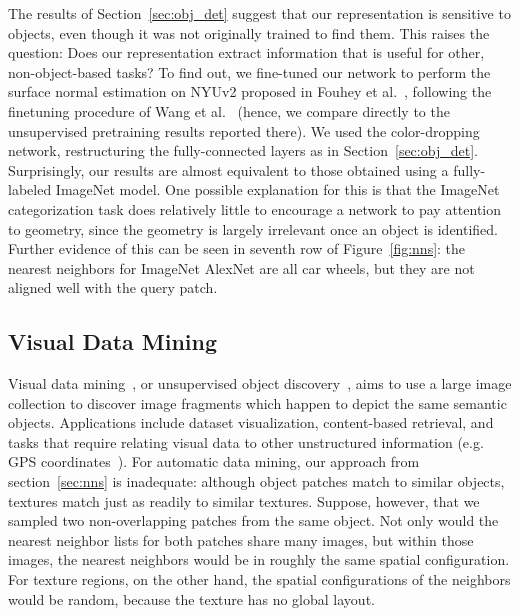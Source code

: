 \documentclass[10pt,twocolumn,letterpaper]{article}
\begin{document}
The results of Section~\ref{sec:obj_det} suggest that our representation is sensitive 
to objects, even though it was not originally trained to find them.  This raises the question:
Does our representation extract information that is useful for other, non-object-based tasks?
To find out, we fine-tuned our network to perform the surface normal estimation on NYUv2 proposed in Fouhey et al.~\cite{Fouhey13a}, following the finetuning procedure of Wang et al.~\cite{wang2015unsupervised} (hence, we compare directly to the unsupervised pretraining results
reported there).  We used the color-dropping network, restructuring the fully-connected
layers as in Section~\ref{sec:obj_det}.  Surprisingly, our results are almost equivalent to
those obtained using a fully-labeled ImageNet model.
One possible explanation for this is that the ImageNet categorization task does relatively
little to encourage a network to pay attention to geometry, since the geometry is largely
irrelevant once an object is identified.  Further evidence of this can be seen in seventh row of
Figure~\ref{fig:nns}: the nearest neighbors for ImageNet AlexNet are all car wheels, but they are
not aligned well with the query patch.


\vspace{-0.05in}
\subsection{Visual Data Mining}
\label{sec:datamining}
\vspace{-0.05in}
Visual data mining~\cite{quack2008world,doersch2012makes,singh2012unsupervised,RematasCVPR15}, or unsupervised object discovery~\cite{sivic2005discovering,russell2006using,grauman2006unsupervised}, 
aims to use a large image collection to discover image fragments which happen to depict the same semantic objects. 
Applications include dataset visualization, content-based retrieval, and tasks that require relating visual data to other unstructured information (e.g. GPS coordinates~\cite{doersch2012makes}).
For automatic data mining, our approach from section~\ref{sec:nns} is inadequate: 
although object patches match to similar objects, textures match just as readily to similar textures.  Suppose, however, that we sampled two non-overlapping patches from the same object.  Not only would the nearest neighbor lists for both patches share many images, but within those images, the nearest neighbors would be in roughly the same spatial configuration.  For texture regions, on the other hand, the spatial configurations of the neighbors would be random, because the texture has no global layout.
\end{document}
